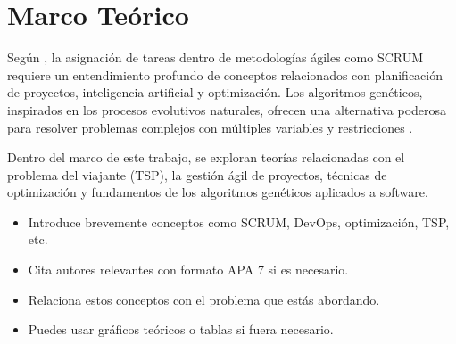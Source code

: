 \section{Marco Teórico}

Según \textcite{scrum2020}, la asignación de tareas dentro de metodologías ágiles como SCRUM requiere un entendimiento profundo de conceptos relacionados con planificación de proyectos, inteligencia artificial y optimización. Los algoritmos genéticos, inspirados en los procesos evolutivos naturales, ofrecen una alternativa poderosa para resolver problemas complejos con múltiples variables y restricciones \parencite{goldberg}.


Dentro del marco de este trabajo, se exploran teorías relacionadas con el problema del viajante (TSP), la gestión ágil de proyectos, técnicas de optimización y fundamentos de los algoritmos genéticos aplicados a software.

\vspace{0.5cm}

\begin{tcolorbox}[colback=gray!10,colframe=black!30,title={Sugerencias para esta sección}]
    \begin{itemize}
        \item Introduce brevemente conceptos como SCRUM, DevOps, optimización, TSP, etc.
        \item Cita autores relevantes con formato APA 7 si es necesario.
        \item Relaciona estos conceptos con el problema que estás abordando.
        \item Puedes usar gráficos teóricos o tablas si fuera necesario.
    \end{itemize}
\end{tcolorbox}

